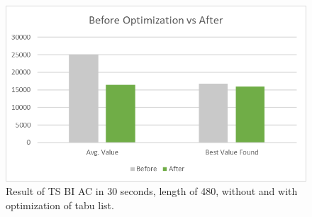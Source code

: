 			\begin{figure}
				\centering
				\includegraphics[width=\linewidth]{img/RI-calibration-optimize}
				\caption{Result of TS BI AC in 30 seconds, length of 480, without and with optimization of tabu list.}
				\label{fig:ri-calibration-optimize}
			\end{figure}
		
		
			
			
		
			
			
		
			
		
			
			
			
	
	
	
		
		
	